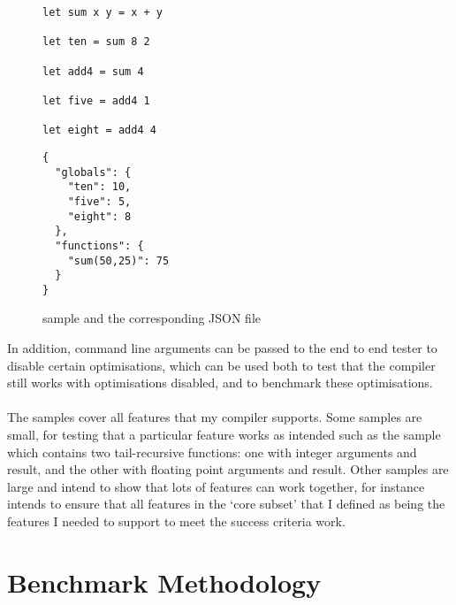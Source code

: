 \begin{figure}[h]
	\begin{minipage}[t]{0.5\linewidth}
		\begin{verbatim}
let sum x y = x + y

let ten = sum 8 2

let add4 = sum 4

let five = add4 1

let eight = add4 4
		\end{verbatim}
	\end{minipage}
	\begin{minipage}[t]{0.5\linewidth}
		\begin{verbatim}
{
  "globals": {
    "ten": 10,
    "five": 5,
    "eight": 8
  },
  "functions": {
    "sum(50,25)": 75
  }
}
		\end{verbatim}
	\end{minipage}
	\caption{ sample and the corresponding JSON file}
	\label{fig:sample}
\end{figure}
In addition, command line arguments can be passed to the end to end tester to disable certain optimisations, which can be used both to test that the compiler still works with optimisations disabled, and to benchmark these optimisations.
\\\\
The samples cover all features that my compiler supports. Some samples are small, for testing that a particular feature works as intended such as the  sample which contains two tail-recursive functions: one with integer arguments and result, and the other with floating point arguments and result. Other samples are large and intend to show that lots of features can work together, for instance  intends to ensure that all features in the `core subset' that I defined as being the features I needed to support to meet the success criteria work.

\section{Benchmark Methodology}

